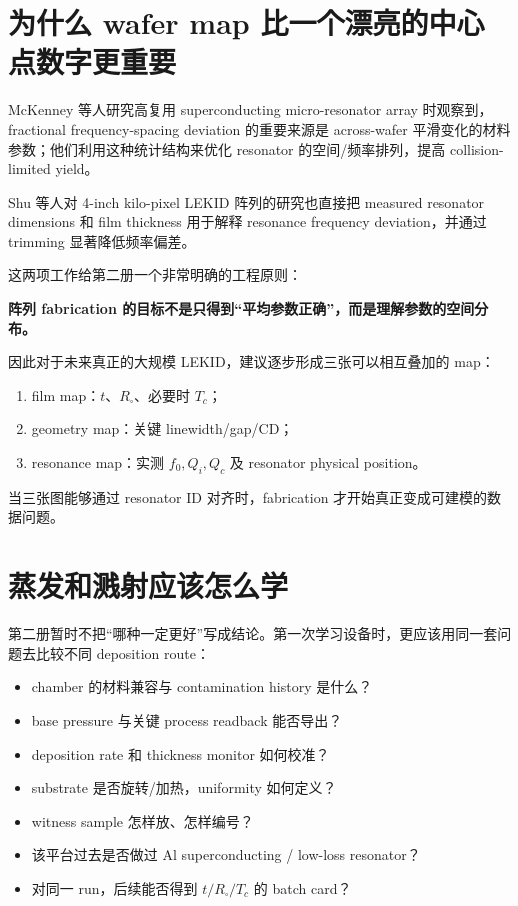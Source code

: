 \section{为什么 wafer map 比一个漂亮的中心点数字更重要}

McKenney 等人研究高复用 superconducting micro-resonator array 时观察到，fractional frequency-spacing deviation 的重要来源是 across-wafer 平滑变化的材料参数；他们利用这种统计结构来优化 resonator 的空间/频率排列，提高 collision-limited yield。

Shu 等人对 4-inch kilo-pixel LEKID 阵列的研究也直接把 measured resonator dimensions 和 film thickness 用于解释 resonance frequency deviation，并通过 trimming 显著降低频率偏差。

这两项工作给第二册一个非常明确的工程原则：

\begin{center}
\textbf{阵列 fabrication 的目标不是只得到“平均参数正确”，而是理解参数的空间分布。}
\end{center}

因此对于未来真正的大规模 LEKID，建议逐步形成三张可以相互叠加的 map：

\begin{enumerate}
  \item film map：$t$、$R_\square$、必要时 $T_c$；
  \item geometry map：关键 linewidth/gap/CD；
  \item resonance map：实测 $f_0,Q_i,Q_c$ 及 resonator physical position。
\end{enumerate}

当三张图能够通过 resonator ID 对齐时，fabrication 才开始真正变成可建模的数据问题。

\section{蒸发和溅射应该怎么学}

第二册暂时不把“哪种一定更好”写成结论。第一次学习设备时，更应该用同一套问题去比较不同 deposition route：

\begin{itemize}
  \item chamber 的材料兼容与 contamination history 是什么？
  \item base pressure 与关键 process readback 能否导出？
  \item deposition rate 和 thickness monitor 如何校准？
  \item substrate 是否旋转/加热，uniformity 如何定义？
  \item witness sample 怎样放、怎样编号？
  \item 该平台过去是否做过 Al superconducting / low-loss resonator？
  \item 对同一 run，后续能否得到 $t/R_\square/T_c$ 的 batch card？
\end{itemize}

